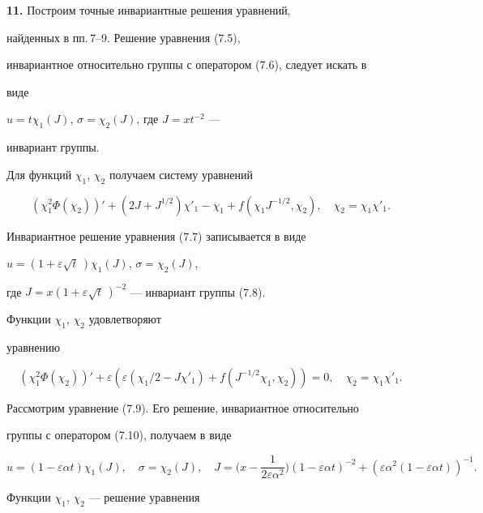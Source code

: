  


{\bf 11.} Построим точные инвариантные решения уравнений, 


найденных в пп.\,7--9. Решение уравнения (7.5), 


инвариантное относительно группы с оператором (7.6), следует искать в 


виде 


$u=t\chi_1(J)$, $\sigma=\chi_2(J)$, где $J=x t^{-2}$ --- 


инвариант группы. 


Для функций $\chi_1$, $\chi_2$ получаем систему уравнений 


$$ 


(\chi^2_1\Phi(\chi_2))'+(2J+J^{1/2})\chi'_1- 


\chi_1+f(\chi_1J^{-1/2},\chi_2),\quad \chi_2=\chi_1\chi'_1. 


$$ 


 


Инвариантное решение уравнения (7.7) записывается в виде 


$u=(1+\varepsilon\sqrt{t}\,)\chi_1(J)$, $\sigma=\chi_2(J)$, 


где $J=x(1+\varepsilon\sqrt{t}\,)^{-2}$ --- инвариант группы (7.8). 


Функции $\chi_1$, $\chi_2$ удовлетворяют 


уравнению 


$$ 


(\chi^2_1\Phi(\chi_2))'+\varepsilon(\varepsilon 


(\chi_1/2-J\chi'_1)+f(J^{-1/2}\chi_1,\chi_2))=0,\quad 


\chi_2=\chi_1\chi'_1. 


$$ 


 


Рассмотрим уравнение (7.9). Его решение, инвариантное относительно 


группы с оператором (7.10), получаем в виде 


$$ 


u=(1-\varepsilon\alpha t)\chi_1(J),\quad \sigma=\chi_2(J),\quad 


J=\bigg(x-\frac{1}{2\varepsilon\alpha^2} \bigg) 


(1-\varepsilon\alpha t)^{-2}+(\varepsilon\alpha^2 


(1-\varepsilon\alpha t))^{-1}. 


$$ 


Функции $\chi_1$, $\chi_2$ --- решение уравнения 


